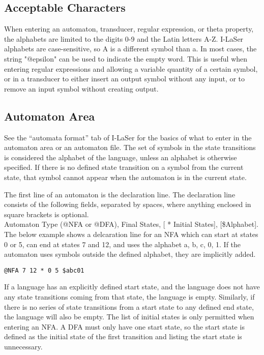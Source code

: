 \documentclass{article}
\begin{document}
\subsection{Acceptable Characters}
When entering an automaton, transducer, regular expression, or theta property, the alphabets are limited to the digits 0-9 and the Latin letters A-Z.
I-LaSer alphabets are case-sensitive, so A is a different symbol than a.
In most cases, the string "@epsilon" can be used to indicate the empty word.
This is useful when entering regular expressions and allowing a variable quantity of a certain symbol, or in a transducer to either insert an output symbol without any input, or to remove an input symbol without creating output.

\subsection{Automaton Area}
See the ``automata format'' tab of I-LaSer for the basics of what to enter in the automaton area or an automaton file. The set of symbols in the state transitions is considered the alphabet of the language, unless an alphabet is otherwise specified. If there is no defined state transition on a symbol from the current state, that symbol cannot appear when the automaton is in the current state.
\par The first line of an automaton is the declaration line. The declaration line consists of the following fields, separated by spaces, where anything enclosed in square brackets is optional.\\
Automaton Type (@NFA or @DFA), Final States, [ * Initial States], [\$Alphabet].
The below example shows a delcaration line for an NFA which can start at states 0 or 5, can end at states 7 and 12, and uses the alphabet {a, b, c, 0, 1}.
If the automaton uses symbols outside the defined alphabet, they are implicitly added.
\begin{center}
\verb-@NFA 7 12 * 0 5 $abc01-
\end{center}
If a language has an explicitly defined start state, and the language does not have any state transitions coming from that state, the language is empty.
Similarly, if there is no series of state transitions from a start state to any defined end state, the language will also be empty.
The list of initial states is only permitted when entering an NFA.
A DFA must only have one start state, so the start state is defined as the initial state of the first transition and listing the start state is unnecessary.
\end{document}
